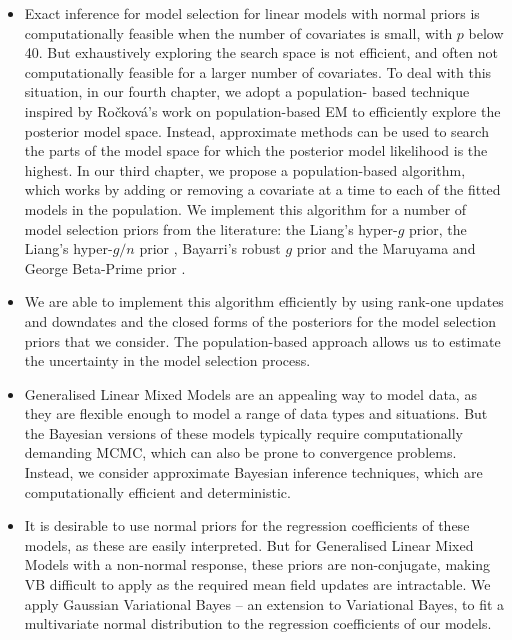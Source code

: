 \begin{itemize}
\item Exact inference for model selection for linear models with normal priors
    is computationally feasible when the number of  covariates is small, with
    $p$ below 40. But exhaustively exploring the search space is not efficient,
    and often not computationally feasible for a larger number of covariates.
    To deal with this situation, in our fourth chapter, we adopt a population-
    based technique inspired by Ro\v{c}kov\'{a}'s work on population-based EM
    \citep{Rockova2017} to efficiently explore the posterior model space.
    Instead, approximate methods can be used to search the parts of the model
    space for which the posterior model likelihood is the highest. In our
    third chapter, we propose a population-based algorithm, which works by
    adding or removing a covariate at a time to each of the fitted models in
    the population. We implement this algorithm for a number of model selection
    priors from the literature: the Liang's hyper-$g$ prior, the Liang's
    hyper-$g/n$ prior \citep{Liang2008}, Bayarri's robust $g$ prior
    \citep{Bayarri2012} and the Maruyama and George Beta-Prime prior
    \citep{Maruyama2011}.


\item We are able to implement this algorithm efficiently by using rank-one
updates and downdates and the closed forms of the posteriors for the model
selection priors that we consider. The population-based approach allows us to
estimate the uncertainty in the model selection process.


\item Generalised Linear Mixed Models are an appealing way to model data, as
they are flexible enough to model a range of data types and situations. But the
Bayesian versions of these models typically require computationally demanding
MCMC, which can also be prone to convergence problems. Instead, we consider
approximate Bayesian inference techniques, which are computationally efficient
and deterministic.

\item It is desirable to use normal priors for the regression coefficients of
these models, as these are easily interpreted. But for Generalised Linear Mixed
Models with a non-normal response, these priors are non-conjugate, making VB
difficult to apply as the required mean field updates are intractable. We apply
Gaussian Variational Bayes -- an extension to Variational Bayes, to fit a
multivariate normal distribution to the regression coefficients of our models.


\end{itemize}
